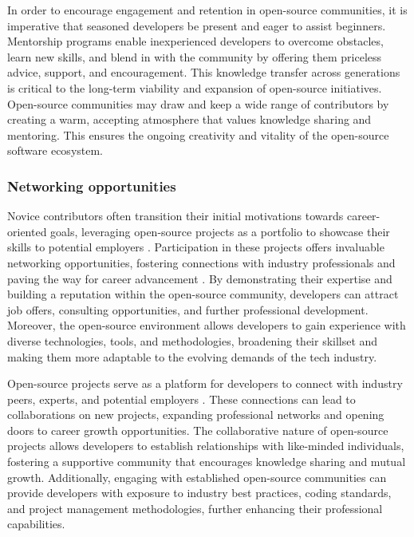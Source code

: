 In order to encourage engagement and retention in open-source communities, it is imperative that seasoned developers be present and eager to assist beginners. Mentorship programs enable inexperienced developers to overcome obstacles, learn new skills, and blend in with the community by offering them priceless advice, support, and encouragement. This knowledge transfer across generations is critical to the long-term viability and expansion of open-source initiatives. Open-source communities may draw and keep a wide range of contributors by creating a warm, accepting atmosphere that values knowledge sharing and mentoring. This ensures the ongoing creativity and vitality of the open-source software ecosystem.



\subsubsection{Networking opportunities}
Novice contributors often transition their initial motivations towards career-oriented goals, leveraging open-source projects as a portfolio to showcase their skills to potential employers \cite{05bitzer2007intrinsic,11gerosa2021shifting}. Participation in these projects offers invaluable networking opportunities, fostering connections with industry professionals and paving the way for career advancement \cite{10wu2007empirical,11gerosa2021shifting,13li2012leadership}. By demonstrating their expertise and building a reputation within the open-source community, developers can attract job offers, consulting opportunities, and further professional development. Moreover, the open-source environment allows developers to gain experience with diverse technologies, tools, and methodologies, broadening their skillset and making them more adaptable to the evolving demands of the tech industry.

Open-source projects serve as a platform for developers to connect with industry peers, experts, and potential employers \cite{10wu2007empirical,11gerosa2021shifting,13li2012leadership}. These connections can lead to collaborations on new projects, expanding professional networks and opening doors to career growth opportunities. The collaborative nature of open-source projects allows developers to establish relationships with like-minded individuals, fostering a supportive community that encourages knowledge sharing and mutual growth.  Additionally, engaging with established open-source communities can provide developers with exposure to industry best practices, coding standards, and project management methodologies, further enhancing their professional capabilities.

